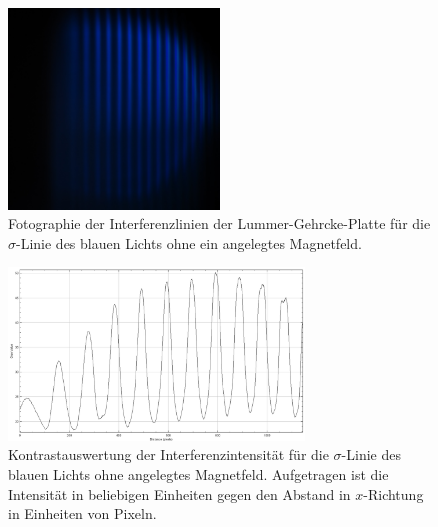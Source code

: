 \begin{figure}
  \centering
  \includegraphics[width=0.5\textwidth]{bilder/3000_BLAU_0mT_sigma.jpg}
  \caption{Fotographie der Interferenzlinien der Lummer-Gehrcke-Platte für die $\sigma$-Linie des blauen Lichts ohne ein angelegtes Magnetfeld.}
  \label{abb:sigmablau0mT}
\end{figure}
\begin{figure}
  \centering
  \includegraphics[width=0.7\textwidth]{bilder/sigmaBLAU_0mT.PNG}
  \caption{Kontrastauswertung der Interferenzintensität für die $\sigma$-Linie des blauen Lichts ohne angelegtes Magnetfeld. Aufgetragen ist die Intensität in beliebigen Einheiten gegen den Abstand in $x$-Richtung in Einheiten von Pixeln.}
  \label{abb:plotsigmablau0mT}
\end{figure}
